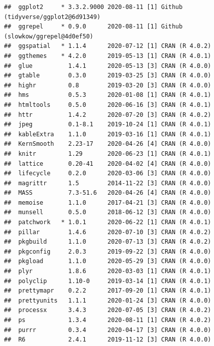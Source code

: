 \documentclass[
  french,
]{book}
\begin{document}
\begin{verbatim}
##  ggplot2     * 3.3.2.9000 2020-08-11 [1] Github (tidyverse/ggplot2@6d91349)
##  ggrepel     * 0.9.0      2020-08-11 [1] Github (slowkow/ggrepel@4d0ef50)  
##  ggspatial   * 1.1.4      2020-07-12 [1] CRAN (R 4.0.2)                    
##  ggthemes    * 4.2.0      2019-05-13 [1] CRAN (R 4.0.1)                    
##  glue          1.4.1      2020-05-13 [3] CRAN (R 4.0.0)                    
##  gtable        0.3.0      2019-03-25 [3] CRAN (R 4.0.0)                    
##  highr         0.8        2019-03-20 [3] CRAN (R 4.0.0)                    
##  hms           0.5.3      2020-01-08 [1] CRAN (R 4.0.1)                    
##  htmltools     0.5.0      2020-06-16 [3] CRAN (R 4.0.1)                    
##  httr          1.4.2      2020-07-20 [3] CRAN (R 4.0.2)                    
##  jpeg          0.1-8.1    2019-10-24 [1] CRAN (R 4.0.1)                    
##  kableExtra    1.1.0      2019-03-16 [1] CRAN (R 4.0.1)                    
##  KernSmooth    2.23-17    2020-04-26 [4] CRAN (R 4.0.0)                    
##  knitr         1.29       2020-06-23 [1] CRAN (R 4.0.1)                    
##  lattice       0.20-41    2020-04-02 [4] CRAN (R 4.0.0)                    
##  lifecycle     0.2.0      2020-03-06 [3] CRAN (R 4.0.0)                    
##  magrittr      1.5        2014-11-22 [3] CRAN (R 4.0.0)                    
##  MASS          7.3-51.6   2020-04-26 [4] CRAN (R 4.0.0)                    
##  memoise       1.1.0      2017-04-21 [3] CRAN (R 4.0.0)                    
##  munsell       0.5.0      2018-06-12 [3] CRAN (R 4.0.0)                    
##  patchwork   * 1.0.1      2020-06-22 [1] CRAN (R 4.0.1)                    
##  pillar        1.4.6      2020-07-10 [3] CRAN (R 4.0.2)                    
##  pkgbuild      1.1.0      2020-07-13 [3] CRAN (R 4.0.2)                    
##  pkgconfig     2.0.3      2019-09-22 [3] CRAN (R 4.0.0)                    
##  pkgload       1.1.0      2020-05-29 [3] CRAN (R 4.0.0)                    
##  plyr          1.8.6      2020-03-03 [1] CRAN (R 4.0.1)                    
##  polyclip      1.10-0     2019-03-14 [1] CRAN (R 4.0.1)                    
##  prettymapr    0.2.2      2017-09-20 [1] CRAN (R 4.0.1)                    
##  prettyunits   1.1.1      2020-01-24 [3] CRAN (R 4.0.0)                    
##  processx      3.4.3      2020-07-05 [3] CRAN (R 4.0.2)                    
##  ps            1.3.4      2020-08-11 [1] CRAN (R 4.0.2)                    
##  purrr         0.3.4      2020-04-17 [3] CRAN (R 4.0.0)                    
##  R6            2.4.1      2019-11-12 [3] CRAN (R 4.0.0)                    

\end{verbatim}
\end{document}
